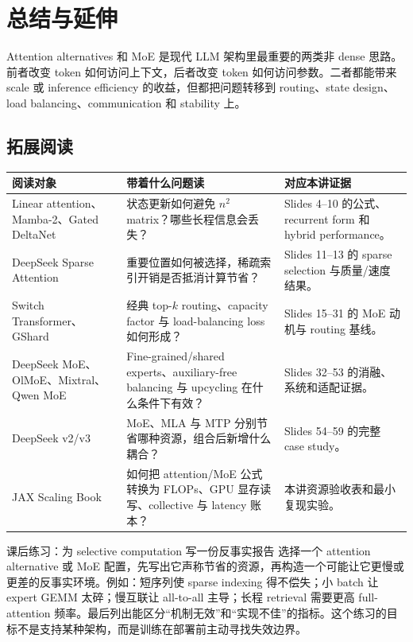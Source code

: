 \section{总结与延伸}
Attention alternatives 和 MoE 是现代 LLM 架构里最重要的两类非 dense 思路。前者改变 token 如何访问上下文，后者改变 token 如何访问参数。二者都能带来 scale 或 inference efficiency 的收益，但都把问题转移到 routing、state design、load balancing、communication 和 stability 上。
\subsection{拓展阅读}
\begin{longtable}{p{}p{}p{}}
\toprule
阅读对象 & 带着什么问题读 & 对应本讲证据 \\
\midrule
Linear attention、Mamba-2、Gated DeltaNet & 状态更新如何避免 $n^2$ matrix？哪些长程信息会丢失？ & Slides 4--10 的公式、recurrent form 和 hybrid performance。 \\
DeepSeek Sparse Attention & 重要位置如何被选择，稀疏索引开销是否抵消计算节省？ & Slides 11--13 的 sparse selection 与质量/速度结果。 \\
Switch Transformer、GShard & 经典 top-$k$ routing、capacity factor 与 load-balancing loss 如何形成？ & Slides 15--31 的 MoE 动机与 routing 基线。 \\
DeepSeek MoE、OlMoE、Mixtral、Qwen MoE & Fine-grained/shared experts、auxiliary-free balancing 与 upcycling 在什么条件下有效？ & Slides 32--53 的消融、系统和适配证据。 \\
DeepSeek v2/v3 & MoE、MLA 与 MTP 分别节省哪种资源，组合后新增什么耦合？ & Slides 54--59 的完整 case study。 \\
JAX Scaling Book & 如何把 attention/MoE 公式转换为 FLOPs、GPU 显存读写、collective 与 latency 账本？ & 本讲资源验收表和最小复现实验。 \\
\bottomrule
\end{longtable}

\begin{importantbox}{课后练习：为 selective computation 写一份反事实报告}
选择一个 attention alternative 或 MoE 配置，先写出它声称节省的资源，再构造一个可能让它更慢或更差的反事实环境。例如：短序列使 sparse indexing 得不偿失；小 batch 让 expert GEMM 太碎；慢互联让 all-to-all 主导；长程 retrieval 需要更高 full-attention 频率。最后列出能区分“机制无效”和“实现不佳”的指标。这个练习的目标不是支持某种架构，而是训练在部署前主动寻找失效边界。
\end{importantbox}

